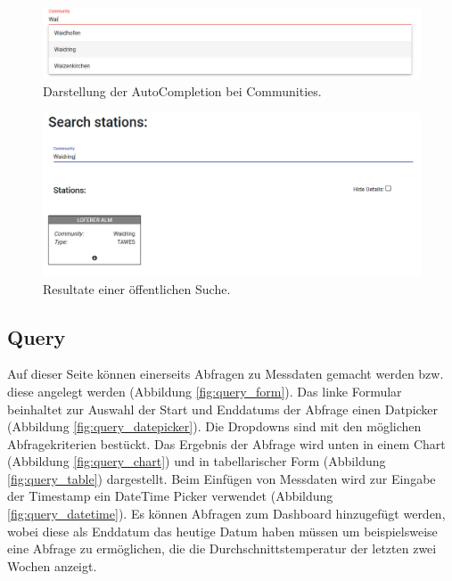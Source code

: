 \documentclass[12pt, letterpaper]{article}
\begin{document}
\begin{figure}[H]
    \centering
    \includegraphics[width=\textwidth]{img/search/search_autocomplete.png}
    \caption{Darstellung der AutoCompletion bei Communities.}
    \label{fig:search_autocomplete}
\end{figure}

\begin{figure}[H]
    \centering
    \includegraphics[width=\textwidth]{img/search/search_results.png}
    \caption{Resultate einer öffentlichen Suche.}
    \label{fig:search_results}
\end{figure}


\subsection{Query}

Auf dieser Seite können einerseits Abfragen zu Messdaten gemacht werden bzw. diese angelegt werden (Abbildung \ref{fig:query_form}). Das linke Formular beinhaltet zur Auswahl der Start und Enddatums der Abfrage einen Datpicker (Abbildung \ref{fig:query_datepicker}). Die Dropdowns sind mit den möglichen Abfragekriterien bestückt. Das Ergebnis der Abfrage wird unten in einem Chart (Abbildung \ref{fig:query_chart}) und in tabellarischer Form (Abbildung \ref{fig:query_table}) dargestellt. Beim Einfügen von Messdaten wird zur Eingabe der Timestamp ein DateTime Picker verwendet (Abbildung \ref{fig:query_datetime}).
Es können Abfragen zum Dashboard hinzugefügt werden, wobei diese als Enddatum das heutige Datum haben müssen um beispielsweise eine Abfrage zu ermöglichen, die die Durchschnittstemperatur der letzten zwei Wochen anzeigt.
\end{document}
